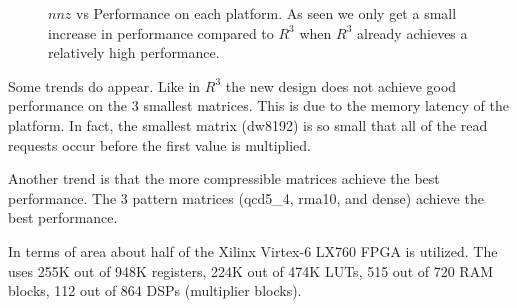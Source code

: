 \begin{figure*}
\caption[SpMV performance on our newest design.]{$nnz$ vs Performance on each platform. As seen we only get a small increase in performance compared to $R^3$ when $R^3$ already achieves a relatively high performance.}
\label{fig:newResults}
\end{figure*}

Some trends do appear. Like in $R^3$ the new design does not achieve good performance on the 3 smallest matrices. This is due to the memory latency of the platform. In fact, the smallest matrix (dw8192) is so small that all of the read requests occur before the first value is multiplied.

Another trend is that the more compressible matrices achieve the best performance. The 3 pattern matrices (qcd5\_4, rma10, and dense) achieve the best performance.

In terms of area about half of the Xilinx Virtex-6 LX760 FPGA is utilized. The uses 255K out of 948K registers, 224K out of 474K LUTs, 515 out of 720 RAM blocks, 112 out of 864 DSPs (multiplier blocks).
